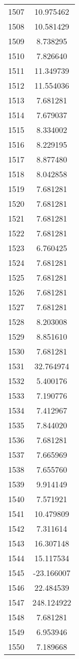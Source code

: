 \documentclass[12pt]{article}
\begin{document}
\begin{longtable}{@{}cc@{}}
1507 & 10.975462 \\
1508 & 10.581429 \\
1509 & 8.738295 \\
1510 & 7.826640 \\
1511 & 11.349739 \\
1512 & 11.554036 \\
1513 & 7.681281 \\
1514 & 7.679037 \\
1515 & 8.334002 \\
1516 & 8.229195 \\
1517 & 8.877480 \\
1518 & 8.042858 \\
1519 & 7.681281 \\
1520 & 7.681281 \\
1521 & 7.681281 \\
1522 & 7.681281 \\
1523 & 6.760425 \\
1524 & 7.681281 \\
1525 & 7.681281 \\
1526 & 7.681281 \\
1527 & 7.681281 \\
1528 & 8.203008 \\
1529 & 8.851610 \\
1530 & 7.681281 \\
1531 & 32.764974 \\
1532 & 5.400176 \\
1533 & 7.190776 \\
1534 & 7.412967 \\
1535 & 7.844020 \\
1536 & 7.681281 \\
1537 & 7.665969 \\
1538 & 7.655760 \\
1539 & 9.914149 \\
1540 & 7.571921 \\
1541 & 10.479809 \\
1542 & 7.311614 \\
1543 & 16.307148 \\
1544 & 15.117534 \\
1545 & -23.166007 \\
1546 & 22.484539 \\
1547 & 248.124922 \\
1548 & 7.681281 \\
1549 & 6.953946 \\
1550 & 7.189668 \\

\end{longtable}
\end{document}
